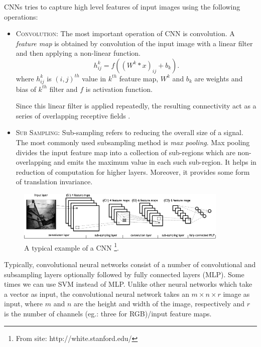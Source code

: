 \noindent CNNs tries to capture high level features of input images using the following operations:
\begin{itemize}
\item \textsc{Convolution}: The most important operation of CNN is convolution.  A \textit{feature map} is obtained by convolution of the input image with a linear filter and then applying a non-linear function. 
$$h^k_{ij} = \mathit{f}( (W^k * x)_{ij} + b_k ).$$
where $h^k_{ij}$ is $(i,j)^{th}$ value in $k^{th}$ feature map, $W^k$ and $b_k$ are weights and bias of $k^{th}$ filter and $\mathit{f}$ is activation function.

Since this linear filter is applied repeatedly, the resulting connectivity act as a series of overlapping receptive fields \cite{KarpathyCVPR14}.
\item \textsc{Sub Sampling}: Sub-sampling refers to reducing the overall size of a signal.  The most commonly used subsampling method is \textit{max pooling}.  Max pooling divides the input feature map into a collection of sub-regions which are non-overlapping and emits the maximum value in each such sub-region.  It helps in reduction of computation for higher layers.  Moreover, it provides some form of translation invariance. 
\end{itemize}

\begin{figure}[!ht]
\centering
\includegraphics[width=0.9\textwidth]{./imgs/cnn1.png} 
\caption[An example of a convolutional neural network]{A typical example of a CNN \footnote{From site: http://white.stanford.edu/}. }
\label{fig:cnn}
\end{figure}

Typically, convolutional neural networks consist of a number of convolutional and subsampling layers optionally followed by fully connected layers (MLP).  Some times we can use SVM instead of MLP.  Unlike other neural networks which take a vector as input,  the convolutional neural network takes an $m \times n \times r$ image as input, where $m$ and $n$ are the height and width of the image, respectively and $r$ is the number of channels (eg.: three for RGB)/input feature maps. 

